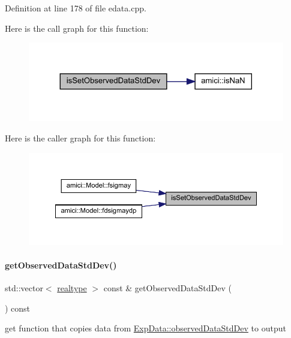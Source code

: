 Definition at line 178 of file edata.\+cpp.

Here is the call graph for this function\+:
\nopagebreak
\begin{figure}[H]
\begin{center}
\leavevmode
\includegraphics[width=324pt]{classamici_1_1_exp_data_a75808a32f77afa60bb736a1dfbce9aba_cgraph}
\end{center}
\end{figure}
Here is the caller graph for this function\+:
\nopagebreak
\begin{figure}[H]
\begin{center}
\leavevmode
\includegraphics[width=350pt]{classamici_1_1_exp_data_a75808a32f77afa60bb736a1dfbce9aba_icgraph}
\end{center}
\end{figure}
\mbox{\label{classamici_1_1_exp_data_ada8a2eebadd4eba1a7c3fa1a014a76d0}} 
\paragraph{\texorpdfstring{getObservedDataStdDev()}{getObservedDataStdDev()}}
{\footnotesize\ttfamily std\+::vector$<$ \mbox{\hyperlink{namespaceamici_a1bdce28051d6a53868f7ccbf5f2c14a3}{realtype}} $>$ const  \& get\+Observed\+Data\+Std\+Dev (\begin{DoxyParamCaption}{ }\end{DoxyParamCaption}) const}

get function that copies data from \mbox{\hyperlink{classamici_1_1_exp_data_aa097568cebb4be48c4c1dfaab0c2a159}{Exp\+Data\+::observed\+Data\+Std\+Dev}} to output

